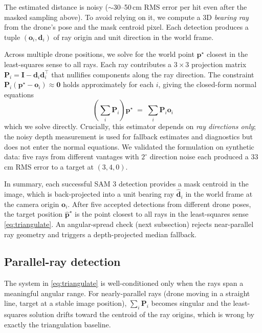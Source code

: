 \documentclass[conference]{IEEEtran}
\begin{document}
The estimated distance is noisy ($\sim$30--50\,cm RMS error per hit
even after the masked sampling above). To avoid relying on it,
we compute a 3D \emph{bearing ray} from the drone's pose and the
mask centroid pixel. Each detection produces a tuple
$(\mathbf{o}_i, \mathbf{d}_i)$ of ray origin and unit direction in
the world frame.

Across multiple drone positions, we solve for the world point
$\mathbf{p}^{\star}$ closest in the least-squares sense to all
rays. Each ray contributes a $3\times 3$ projection matrix
$\mathbf{P}_i = \mathbf{I} - \mathbf{d}_i \mathbf{d}_i^{\top}$
that nullifies components along the ray direction. The
constraint $\mathbf{P}_i (\mathbf{p}^{\star} - \mathbf{o}_i)
\approx \mathbf{0}$ holds approximately for each $i$, giving the
closed-form normal equations
\begin{equation}
\left(\sum_i \mathbf{P}_i\right) \mathbf{p}^{\star}
\;=\;
\sum_i \mathbf{P}_i \mathbf{o}_i
\label{eq:triangulate}
\end{equation}
which we solve directly. Crucially, this estimator depends on
\emph{ray directions only}; the noisy depth measurement is used for
fallback estimates and diagnostics but does not enter the normal
equations. We validated the formulation on synthetic data:
five rays from different vantages with $2^{\circ}$ direction noise
each produced a 33\,cm RMS error to a target at $(3, 4, 0)$.

In summary, each successful SAM 3 detection provides a mask centroid
in the image, which is back-projected into a unit bearing ray
$\hat{\mathbf{d}}_i$ in the world frame at the camera origin
$\mathbf{o}_i$. After five accepted detections from different drone
poses, the target position $\hat{\mathbf{p}}^{\star}$ is the point
closest to all rays in the least-squares sense
\eqref{eq:triangulate}. An angular-spread check (next subsection)
rejects near-parallel ray geometry and triggers a depth-projected
median fallback.

\subsection{Parallel-ray detection}

The system in \eqref{eq:triangulate} is well-conditioned only when
the rays span a meaningful angular range. For nearly-parallel rays
(drone moving in a straight line, target at a stable image
position), $\sum_i \mathbf{P}_i$ becomes singular and the
least-squares solution drifts toward the centroid of the ray
origins, which is wrong by exactly the triangulation baseline.
\end{document}
